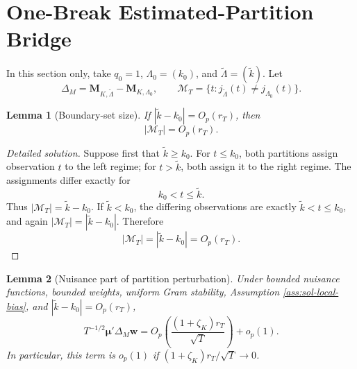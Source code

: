 \documentclass[12pt]{article}
\numberwithin{equation}{section}
\newtheorem{lemma}{Lemma}
\theoremstyle{definition}
\begin{document}
\section{One-Break Estimated-Partition Bridge}
\label{sec:one-break-bridge}

In this section only, take \(q_0=1\), \(\Lambda_0=(k_0)\), and \(\widetilde\Lambda=(\widetilde k)\). Let
\[
    \Delta_M=\bm M_{K,\widetilde\Lambda}-\bm M_{K,\Lambda_0},
    \qquad
    \mathcal M_T=\{t:j_{\widetilde\Lambda}(t)\neq j_{\Lambda_0}(t)\}.
\]

\begin{lemma}[Boundary-set size]
\label{lem:wb-boundary-size}
If \(|\widetilde k-k_0|=O_p(r_T)\), then
\[
    |\mathcal M_T|=O_p(r_T).
\]
\end{lemma}


\begin{proof}[Detailed solution]
Suppose first that \(\widetilde k\geq k_0\).  For
\(t\leq k_0\), both partitions assign observation \(t\) to the left regime;
for \(t>\widetilde k\), both assign it to the right regime.  The assignments
differ exactly for
\[
    k_0<t\leq\widetilde k.
\]
Thus \(|\mathcal M_T|=\widetilde k-k_0\).  If
\(\widetilde k<k_0\), the differing observations are exactly
\(\widetilde k<t\leq k_0\), and again
\(|\mathcal M_T|=|\widetilde k-k_0|\).  Therefore
\[
    |\mathcal M_T|=|\widetilde k-k_0|=O_p(r_T).
\]
\end{proof}


\begin{lemma}[Nuisance part of partition perturbation]
\label{lem:wb-bridge-mu}
Under bounded nuisance functions, bounded weights, uniform Gram stability,
Assumption \ref{ass:sol-local-bias}, and
\(|\widetilde k-k_0|=O_p(r_T)\),
\[
    T^{-1/2}\bm\mu'\Delta_M\bm w
    =
    O_p\!\left(\frac{(1+\zeta_K)r_T}{\sqrt T}\right)+o_p(1).
\]
In particular, this term is \(o_p(1)\) if \((1+\zeta_K)r_T/\sqrt T\to0\).
\end{lemma}
\end{document}

